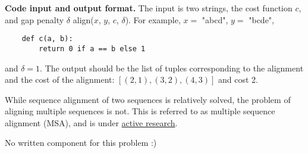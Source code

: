 \documentclass{hw}
\newcommand{\io}{\textbf{Code input and output format.} }
\begin{document}
\begin{challenge}
    
    \io The input is two strings, the cost function $c$, and gap penalty $\delta$
    align($x$, $y$, $c$, $\delta$).
    For example, $x = $ "abcd", $y=$ "bcde",
    \begin{verbatim}
    def c(a, b):
        return 0 if a == b else 1
    \end{verbatim}
    and $\delta = 1$.
    The output should be the list of tuples corresponding to the alignment and the cost of the alignment:
    $[(2,1), (3,2), (4,3)]$ and cost 2.
    
    
    While sequence alignment of two sequences is relatively solved,
    the problem of aligning multiple sequences is not.
    This is referred to as multiple sequence alignment (MSA),
    and is under \href{https://academic.oup.com/bioinformatics/article/39/1/btac724/6820925}{active research}.
\end{challenge}

\begin{solution}
No written component for this problem :)
\end{solution}
\end{document}
